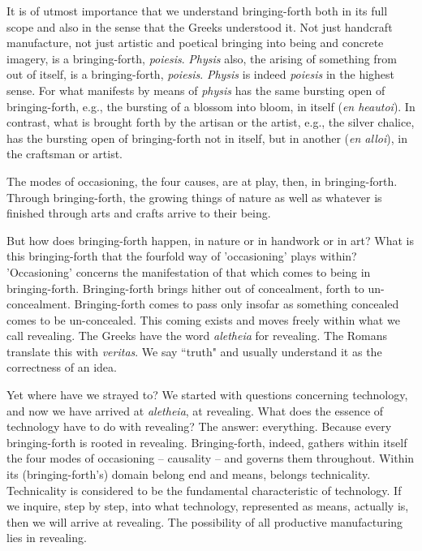 \documentclass[12pt]{article}
\begin{document}
It is of utmost importance that we understand bringing-forth both in its full scope and also in the sense that the Greeks understood it. Not just handcraft manufacture, not just artistic and poetical bringing into being and concrete imagery, is a bringing-forth, \textit{poi{\-e}sis}. \textit{Physis} also, the arising of something from out of itself, is a bringing-forth, \textit{poi{\-e}sis}. \textit{Physis} is indeed \textit{poi{\-e}sis} in the highest sense. For what manifests by means of \textit{physis} has the same bursting open of bringing-forth, e.g., the bursting of a blossom into bloom, in itself (\textit{en heaut{\-o}i}). In contrast, what is brought forth by the artisan or the artist, e.g., the silver chalice, has the bursting open of bringing-forth not in itself, but in another (\textit{en all{\-o}i}), in the craftsman or artist.

The modes of occasioning, the four causes, are at play, then, in bringing-forth. Through bringing-forth, the growing things of nature as well as whatever is finished through arts and crafts arrive to their being.

But how does bringing-forth happen, in nature or in handwork or in art? What is this bringing-forth that the fourfold way of 'occasioning' plays within? 'Occasioning' concerns the manifestation of that which comes to being in bringing-forth. Bringing-forth brings hither out of concealment, forth to un-concealment. Bringing-forth comes to pass only insofar as something concealed comes to be un-concealed. This coming exists and moves freely within what we call revealing. The Greeks have the word \textit{al{\-e}theia} for revealing. The Romans translate this with \textit{veritas}. We say ``truth" and usually understand it as the correctness of an idea.

\vspace{10mm}

Yet where have we strayed to? We started with questions concerning technology, and now we have arrived at \textit{al{\-e}theia}, at revealing. What does the essence of technology have to do with revealing? The answer: everything. Because every bringing-forth is rooted in revealing. Bringing-forth, indeed, gathers within itself the four modes of occasioning -- causality -- and governs them throughout. Within its (bringing-forth's) domain belong end and means, belongs technicality. Technicality is considered to be the fundamental characteristic of technology. If we inquire, step by step, into what technology, represented as means, actually is, then we will arrive at revealing. The possibility of all productive manufacturing lies in revealing.
\end{document}
